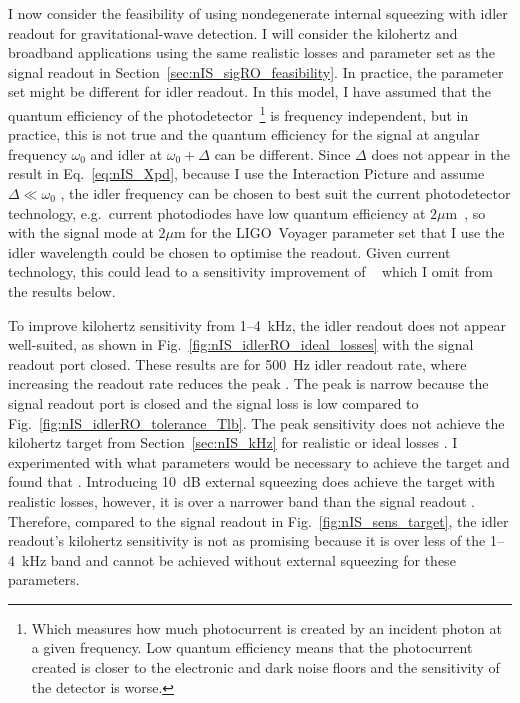 I now consider the feasibility of using nondegenerate internal squeezing with idler readout for gravitational-wave detection. I will consider the kilohertz and broadband applications using the same realistic losses and parameter set as the signal readout in Section~\ref{sec:nIS_sigRO_feasibility}. 
In practice, the parameter set might be different for idler readout. In this model, I have assumed that the quantum efficiency of the photodetector~\footnote{Which measures how much photocurrent is created by an incident photon at a given frequency. Low quantum efficiency means that the photocurrent created is closer to the electronic and dark noise floors and the sensitivity of the detector is worse. } is frequency independent, but in practice, this is not true and the quantum efficiency for the signal at angular frequency $\omega_0$ and idler at $\omega_0+\Delta$ can be different. Since $\Delta$ does not appear in the result in Eq.~\ref{eq:nIS_Xpd}, because I use the Interaction Picture and assume $\Delta\ll\omega_0$ , the idler frequency can be chosen to best suit the current photodetector technology, e.g.\ current photodiodes have low quantum efficiency at $2 \mu\text{m}$~\cite{}, so with the signal mode at $2 \mu\text{m}$ for the LIGO~Voyager parameter set that I use the idler wavelength could be chosen to optimise the readout. Given current technology, this could lead to a sensitivity improvement of ~\cite{} which I omit from the results below.

To improve kilohertz sensitivity from 1--4~kHz, the idler readout does not appear well-suited, as shown in Fig.~\ref{fig:nIS_idlerRO_ideal_losses} with the signal readout port closed. These results are for 500~Hz idler readout rate, where increasing the readout rate reduces the peak . The peak is narrow because the signal readout port is closed and the signal loss is low compared to Fig.~\ref{fig:nIS_idlerRO_tolerance_Tlb}. The peak sensitivity does not achieve the kilohertz target from Section~\ref{sec:nIS_kHz} for realistic or ideal  losses . I experimented with what parameters would be necessary to achieve the target and found that . Introducing 10~dB external squeezing does achieve the target with realistic losses, however, it is over a narrower band than the signal readout . Therefore, compared to the signal readout in Fig.~\ref{fig:nIS_sens_target}, the idler readout's kilohertz sensitivity is not as promising because it is over less of the 1--4~kHz band and cannot be achieved without external squeezing for these parameters.

